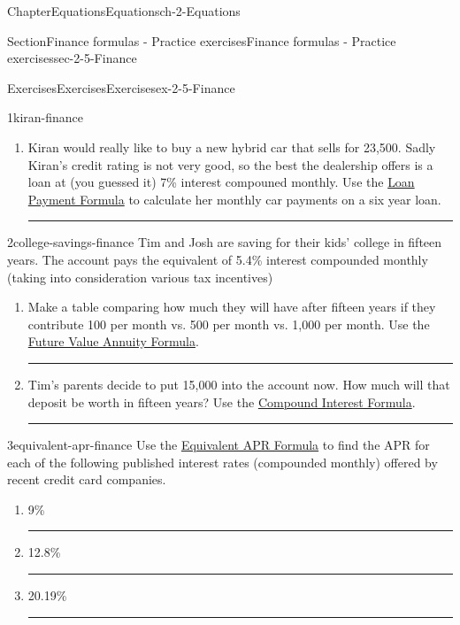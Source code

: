 \documentclass[twoside,11pt,]{book}
\newlength{\workspacestrutwidth}
\numberwithin{equation}{section}
\begin{document}
\begin{chapterptx}{Chapter}{Equations}{}{Equations}{}{}{ch-2-Equations}
\begin{sectionptx}{Section}{Finance formulas - Practice exercises}{}{Finance formulas - Practice exercises}{}{}{sec-2-5-Finance}
\begin{exercises-subsection-numberless}{Exercises}{Exercises}{}{Exercises}{}{}{ex-2-5-Finance}
\begin{divisionexercise}{1}{}{}{kiran-finance}
\begin{enumerate}[label=(\alph*),ref=\alph*]
\par\rule{\workspacestrutwidth}{1.2in}%
\item{}Kiran would really like to buy a new hybrid car that sells for \textdollar{}23,500. Sadly Kiran's credit rating is not very good, so the best the dealership offers is a loan at (you guessed it) 7\% interest compouned monthly. Use the \hyperref[loan-payment-formula]{Loan Payment Formula} to calculate her monthly car payments on a six year loan.%
\par\rule{\workspacestrutwidth}{1.2in}%
\end{enumerate}%
\end{divisionexercise}%
\clearpage
\begin{divisionexercise}{2}{}{}{college-savings-finance}%
Tim and Josh are saving for their kids' college in fifteen years. The account pays the equivalent of 5.4\% interest compounded monthly (taking into consideration various tax incentives)%
\begin{enumerate}[label=(\alph*),ref=\alph*]%
\item{}Make a table comparing how much they will have after fifteen years if they contribute \textdollar{}100 per month vs. \textdollar{}500 per month vs. \textdollar{}1,000 per month. Use the \hyperref[future-value-annuity-formula]{Future Value Annuity Formula}.%
\par\rule{\workspacestrutwidth}{2in}%
\item{}Tim's parents decide to put \textdollar{}15,000 into the account now. How much will that deposit be worth in fifteen years? Use the \hyperref[compound-interest-formula]{Compound Interest Formula}.%
\par\rule{\workspacestrutwidth}{1in}%
\end{enumerate}%
\end{divisionexercise}%
 \begin{divisionexercise}{3}{}{}{equivalent-apr-finance}%
Use the \hyperref[equivalent-apr-formula]{Equivalent APR Formula} to find the APR for each of the following published interest rates (compounded monthly) offered by recent credit card companies.%
\begin{enumerate}[label=(\alph*),ref=\alph*]%
\item{}9\%%
\par\rule{\workspacestrutwidth}{0.5in}%
\item{}12.8\%%
\par\rule{\workspacestrutwidth}{0.5in}%
\item{}20.19\%%
\par\rule{\workspacestrutwidth}{0.5in}%

\end{enumerate}
\end{divisionexercise}
\end{exercises-subsection-numberless}
\end{sectionptx}
\end{chapterptx}
\end{document}
